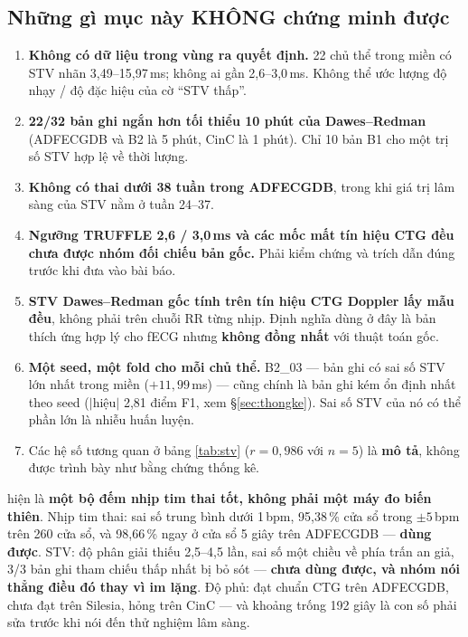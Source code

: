 \subsection{Những gì mục này KHÔNG chứng minh được}

\begin{enumerate}[leftmargin=1.6em,itemsep=3pt]
\item \textbf{Không có dữ liệu trong vùng ra quyết định.} 22 chủ thể trong miền có STV nhãn 3,49--15,97\,ms;
không ai gần 2,6--3,0\,ms. Không thể ước lượng độ nhạy / độ đặc hiệu của cờ ``STV thấp''.
\item \textbf{22/32 bản ghi ngắn hơn tối thiểu 10 phút của Dawes--Redman} (ADFECGDB và B2 là 5 phút, CinC
là 1 phút). Chỉ 10 bản B1 cho một trị số STV hợp lệ về thời lượng.
\item \textbf{Không có thai dưới 38 tuần trong ADFECGDB}, trong khi giá trị lâm sàng của STV nằm ở tuần
24--37.
\item \textbf{Ngưỡng TRUFFLE 2,6 / 3,0\,ms và các mốc mất tín hiệu CTG đều chưa được nhóm đối chiếu bản
gốc.} Phải kiểm chứng và trích dẫn đúng trước khi đưa vào bài báo.
\item \textbf{STV Dawes--Redman gốc tính trên tín hiệu CTG Doppler lấy mẫu đều}, không phải trên chuỗi RR
từng nhịp. Định nghĩa dùng ở đây là bản thích ứng hợp lý cho fECG nhưng \textbf{không đồng nhất} với
thuật toán gốc.
\item \textbf{Một seed, một fold cho mỗi chủ thể.} B2\_03 --- bản ghi có sai số STV lớn nhất trong miền
($+11{,}99$\,ms) --- cũng chính là bản ghi kém ổn định nhất theo seed ($|$hiệu$|$ 2,81 điểm F1, xem
\S\ref{sec:thongke}). Sai số STV của nó có thể phần lớn là nhiễu huấn luyện.
\item Các hệ số tương quan ở bảng \ref{tab:stv} ($r = 0{,}986$ với $n = 5$) là \textbf{mô tả}, không được
trình bày như bằng chứng thống kê.
\end{enumerate}

\begin{ghichu}[title={Phát biểu cuối cùng về giá trị lâm sàng}]
\hethong{} hiện là \textbf{một bộ đếm nhịp tim thai tốt, không phải một máy đo biến thiên}.
Nhịp tim thai: sai số trung bình dưới 1\,bpm, 95,38\,\% cửa sổ trong $\pm5$\,bpm trên 260 cửa sổ, và
98,66\,\% ngay ở cửa sổ 5 giây trên ADFECGDB --- \textbf{dùng được}.
STV: độ phân giải thiếu 2,5--4,5 lần, sai số một chiều về phía trấn an giả, 3/3 bản ghi tham chiếu thấp
nhất bị bỏ sót --- \textbf{chưa dùng được, và nhóm nói thẳng điều đó thay vì im lặng}.
Độ phủ: đạt chuẩn CTG trên ADFECGDB, chưa đạt trên Silesia, hỏng trên CinC --- và khoảng trống 192 giây
là con số phải sửa trước khi nói đến thử nghiệm lâm sàng.
\end{ghichu}
